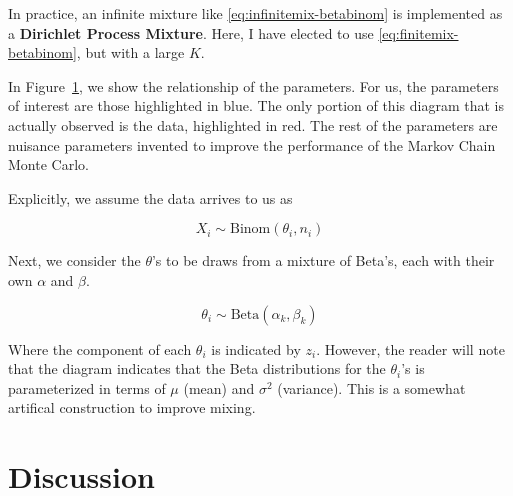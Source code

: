 \documentclass{article}
\begin{document}
In practice, an infinite mixture like \eqref{eq:infinitemix-betabinom} is implemented as a \textbf{Dirichlet Process Mixture}. Here, I have elected to use \eqref{eq:finitemix-betabinom}, but with a large $K$.

\begin{figure}
\centering
{}
\label{fig:diagram}
\end{figure}


In Figure~\ref{fig:diagram}, we show the relationship of the parameters. For us, the parameters of interest are those highlighted in blue. The only portion of this diagram that is actually observed is the data, highlighted in red. The rest of the parameters are nuisance parameters invented to improve the performance of the Markov Chain Monte Carlo.

Explicitly, we assume the data arrives to us as

\begin{equation}\label{eq:data}
    X_i \sim \text{Binom}(\theta_i, n_i)
\end{equation}

Next, we consider the $\theta$'s to be draws from a mixture of Beta's, each with their own $\alpha$ and $\beta$.

\begin{equation}\label{eq:theta}
    \theta_i \sim \text{Beta}(\alpha_k, \beta_k)
\end{equation}

Where the component of each $\theta_i$ is indicated by $z_i$. However, the reader will note that the diagram indicates that the Beta distributions for the $\theta_i$'s is parameterized in terms of $\mu$ (mean) and $\sigma^2$ (variance). This is a somewhat artifical construction to improve mixing.

\section{Discussion}
\end{document}
